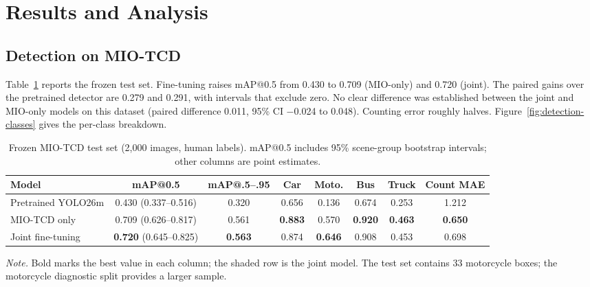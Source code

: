 \section{Results and Analysis}\label{sec:results}

\subsection{Detection on MIO-TCD}\label{sec:results-detection}

Table~\ref{tab:det-test} reports the frozen test set. Fine-tuning raises
mAP@0.5 from 0.430 to 0.709 (MIO-only) and 0.720 (joint). The paired gains over
the pretrained detector are 0.279 and 0.291, with intervals that exclude zero.
No clear difference was established between the joint and MIO-only models on
this dataset (paired difference 0.011, 95\% CI −0.024 to 0.048). Counting error
roughly halves.
Figure~\ref{fig:detection-classes} gives the per-class breakdown.

\begin{table}[htbp]
  \centering
  \small
  \caption{Frozen MIO-TCD test set (2,000 images, human labels). mAP@0.5
  includes 95\% scene-group bootstrap intervals; other columns are point
  estimates.}
  \label{tab:det-test}
  \setlength{\tabcolsep}{3pt}
  \begin{tabular}{@{}lccccccc@{}}
    \toprule
    Model & mAP@0.5 & mAP@.5--.95 & Car & Moto. & Bus & Truck & Count MAE \\
    \midrule
    Pretrained YOLO26m & 0.430 (0.337--0.516) & 0.320 & 0.656 & 0.136 & 0.674 & 0.253 & 1.212 \\
    MIO-TCD only       & 0.709 (0.626--0.817) & 0.561 & \textbf{0.883} & 0.570 & \textbf{0.920} & \textbf{0.463} & \textbf{0.650} \\
    \rowcolor{oursrow}
    Joint fine-tuning  & \textbf{0.720} (0.645--0.825) & \textbf{0.563} & 0.874 & \textbf{0.646} & 0.908 & 0.453 & 0.698 \\
    \bottomrule
  \end{tabular}
  \par\smallskip
  \begin{minipage}{\linewidth}\footnotesize
    \textit{Note.} Bold marks the best value in each column; the shaded row is
    the joint model. The test set contains 33 motorcycle boxes; the motorcycle
    diagnostic split provides a larger sample.
  \end{minipage}
\end{table}

